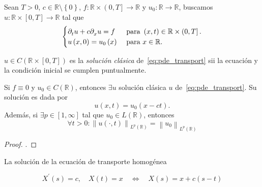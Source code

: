 \begin{example}
	Sean $T>0$, $c\in\mathbb{R}\setminus\left\{0\right\}$,
	$f\colon\mathbb{R}\times\left(0,T\right]\to\mathbb{R}$ y
	$u_{0}\colon\mathbb{R}\to\mathbb{R}$, buscamos
	$u\colon\mathbb{R}\times\left[0,T\right]\to\mathbb{R}$
	tal que
	\begin{equation}
		\begin{cases}
			\difcp{u}{t}+
			c\difcp{u}{x}=f
			 & \text{ para }
			\left(x,t\right)\in\mathbb{R}\times\left(0,T\right]. \\
			u\left(x,0\right)=u_{0}\left(x\right)
			 & \text{ para }
			x\in\mathbb{R}.
		\end{cases}\label{eq:pde_transport}
	\end{equation}
\end{example}

\begin{definition}
	$u\in C\left(\mathbb{R}\times\left[0,T\right]\right)$ es la
	\emph{solución clásica} de~\eqref{eq:pde_transport} sii la
	ecuación y la condición inicial se cumplen puntualmente.
\end{definition}

\begin{theorem}
	Si $f\equiv0$ y $u_{0}\in C\left(\mathbb{R}\right)$, entonces
	$\exists u$ solución clásica $u$ de~\eqref{eq:pde_transport}.
	Su solución es dada por
	\begin{equation*}
		u\left(x,t\right)=
		u_{0}\left(x-ct\right).
	\end{equation*}
	Además, si $\exists p\in\left[1,\infty\right]$ tal que
	$u_{0}\in L\left(\mathbb{R}\right)$, entonces
	\begin{equation*}
		\forall t>0:
		{
		\left\|
		u\left(\cdot,t\right)
		\right\|
		}_{L^{p}\left(\mathbb{R}\right)}=
			{
				\left\|
				u_{0}
				\right\|
			}_{L^{p}\left(\mathbb{R}\right)}
	\end{equation*}
\end{theorem}

\begin{proof}
	.
\end{proof}

La solución de la ecuación de transporte homogénea

\begin{equation*}
	X^{\prime}\left(s\right)=c,\quad
	X\left(t\right)=x\quad\iff\quad
	X\left(s\right)=x+c\left(s-t\right)
\end{equation*}

